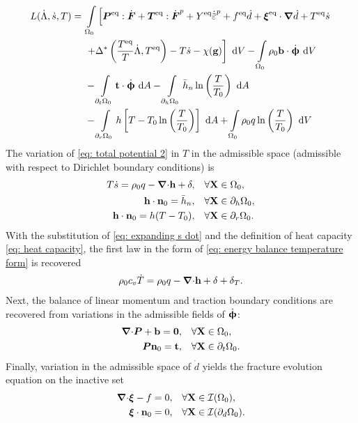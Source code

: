 \begin{equation}
\begin{aligned}
  L(\dot{\Lambda}, \dot{s}, T) =&\ \int\limits_{\body_0} \left[ \bfP^\text{eq}:\dot{\defgrad} + \bfT^\text{eq}:\dot{\defgrad}^p + Y^\text{eq}\epdot + f^\text{eq}\dot{d} + \bs{\xi}^\text{eq}\cdot\grad\dot{d} + T^\text{eq}\dot{s} \right.\\
  &\ \left. + \Delta^*\left( \dfrac{T^\text{eq}}{T}\dot{\Lambda}, T^\text{eq} \right) - T\dot{s} - \chi(\btg) \right] \diff{V} - \int\limits_{\body_0} \rho_0 \btb \cdot \dot{\bs{\upphi}} \diff{V} \\
  &\ - \int\limits_{\partial_t\body_0} \btt \cdot \dot{\bs{\upphi}} \diff{A} - \int\limits_{\partial_h\body_0} \bar{h}_n\ln\left( \dfrac{T}{T_0} \right) \diff{A} \\
  &\ - \int\limits_{\partial_r\body_0} h\left[ T - T_0 \ln\left( \dfrac{T}{T_0} \right) \right] \diff{A} + \int\limits_{\body_0} \rho_0 q \ln\left( \dfrac{T}{T_0} \right) \diff{V} 
\end{aligned}\label{eq: total potential 2}
\end{equation}
The variation of \eqref{eq: total potential 2} in $T$ in the admissible space (admissible with respect to Dirichlet boundary conditions) is
\begin{subequations}
\begin{align}
    T\dot{s} = \rho_0 q - {\boldsymbol{\nabla} \cdot} \textbf{h} + \delta, &\quad \forall \textbf{X} \in \Omega_0, \\
    \textbf{h} \cdot \textbf{n}_0 = \bar{h}_n, &\quad \forall \textbf{X} \in \partial_h\Omega_0, \\
    \textbf{h} \cdot \textbf{n}_0 = h(T - T_0), &\quad \forall \textbf{X} \in \partial_r\Omega_0.
\end{align}
\end{subequations}
With the substitution of \eqref{eq: expanding s dot} and the definition of heat capacity \eqref{eq: heat capacity}, the first law in the form of \eqref{eq: energy balance temperature form} is recovered
\begin{align}
    \rho_0 c_v \dot{T} = \rho_0 q - {\boldsymbol{\nabla} \cdot} \textbf{h} + \delta + \delta_T.
\end{align}
Next, the balance of linear momentum and traction boundary conditions are recovered from variations in the admissible fields of $\dot{\boldsymbol{\upphi}}$:
\begin{subequations}
\begin{align}
  {\boldsymbol{\nabla}\cdot}\boldsymbol{P} + \textbf{b} = \boldsymbol{0}, &\quad \forall \textbf{X} \in \Omega_0, \\
  \boldsymbol{P}\textbf{n}_0 = \textbf{t}, &\quad \forall \textbf{X} \in \partial_t\Omega_0.
\end{align}
\end{subequations}
Finally, variation in the admissible space of $\dot{d}$ yields the fracture evolution equation on the inactive set
\begin{align}
  {\boldsymbol{\nabla}\cdot} \boldsymbol{\xi} - f = 0, &\quad \forall \textbf{X} \in \mathcal{I}(\Omega_0), \\
  \boldsymbol{\xi}\cdot\textbf{n}_0 = 0, &\quad \forall \textbf{X} \in \mathcal{I}(\partial_d\Omega_0).
\end{align}
